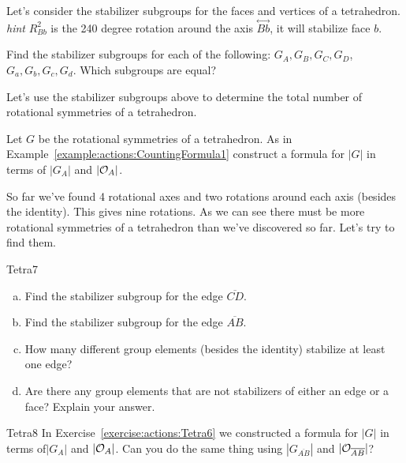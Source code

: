 Let's consider the stabilizer subgroups for the faces and vertices of a tetrahedron. \emph {hint} $R_{Bb}^2$ is the 240 degree rotation around the axis $\overset{\leftrightarrow}{Bb}$, it will stabilize face $b$.  

\begin{exercise}\label{exercise:actions:Tetra5a}
Find the stabilizer subgroups for each of the following:
$G_{A}, G_{B}, G_{C}, G_{D}$, $G_{a}, G_{b}, G_{c}, G_{d}$. Which subgroups are equal?
\end{exercise}

Let's use the stabilizer subgroups above to determine the total number of rotational symmetries of a tetrahedron.  

\begin{exercise}\label{exercise:actions:Tetra6} 
Let $G$ be the rotational symmetries of a tetrahedron.  As in Example~\ref{example:actions:CountingFormula1} construct a formula for $|G|$ in terms of $| G_{A}|$ and $|{\cal O}_{A}|$.  \end {exercise}
So far we've found 4 rotational axes and two rotations around each axis (besides the identity). This gives nine rotations.  As we can see there must be more rotational symmetries of a tetrahedron than we've discovered so far.  Let's try to find them. 

\begin {exercise}{Tetra7}
\begin {enumerate}[(a)]
\item Find the stabilizer subgroup for the edge $\overline{CD}$. 
\item Find the stabilizer subgroup for the edge $\overline{AB}$.
\item How many different group elements (besides the identity) stabilize at least one edge?
\item Are there any group elements that are not stabilizers of either an edge or a face?  Explain your answer.
\end{enumerate}
\end{exercise}	

\begin {exercise}{Tetra8}
In Exercise~\ref{exercise:actions:Tetra6} we constructed a formula for $|G|$ in terms of$| G_{A}|$ and $|{\cal O}_{A}|$.  Can you do the same thing using $| G_{\overline{AB}}|$ and $|{\cal O}_{\overline{AB}}|$?
\end{exercise}

